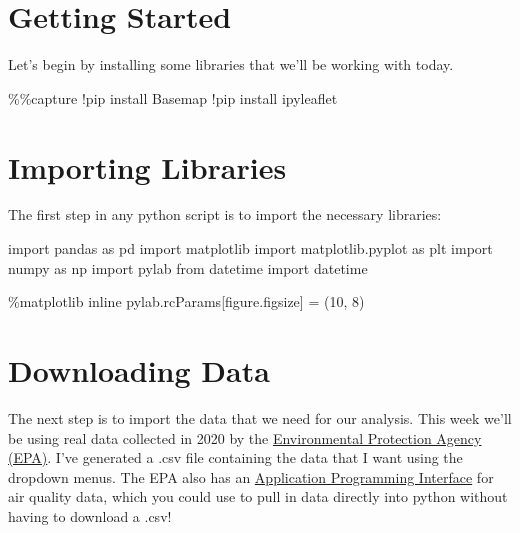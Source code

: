 \documentclass[
  letterpaper,
  DIV=11,
  numbers=noendperiod]{scrreprt}
\newenvironment{Shaded}{\begin{snugshade}}{\end{snugshade}}
\newcommand{\DecValTok}[1]{\textcolor[rgb]{0.68,0.00,0.00}{#1}}
\newcommand{\ImportTok}[1]{\textcolor[rgb]{0.00,0.46,0.62}{#1}}
\newcommand{\NormalTok}[1]{\textcolor[rgb]{0.00,0.23,0.31}{#1}}
\newcommand{\OperatorTok}[1]{\textcolor[rgb]{0.37,0.37,0.37}{#1}}
\newcommand{\StringTok}[1]{\textcolor[rgb]{0.13,0.47,0.30}{#1}}
\begin{document}
\hypertarget{getting-started}{%
\section{Getting Started}\label{getting-started}}

Let's begin by installing some libraries that we'll be working with
today.

\begin{Shaded}
\begin{Highlighting}[]
\OperatorTok{\%\%}\NormalTok{capture}
\OperatorTok{!}\NormalTok{pip install Basemap}
\OperatorTok{!}\NormalTok{pip install ipyleaflet}
\end{Highlighting}
\end{Shaded}

\hypertarget{importing-libraries}{%
\section{Importing Libraries}\label{importing-libraries}}

The first step in any python script is to import the necessary
libraries:

\begin{Shaded}
\begin{Highlighting}[]
\ImportTok{import}\NormalTok{ pandas }\ImportTok{as}\NormalTok{ pd}
\ImportTok{import}\NormalTok{ matplotlib}
\ImportTok{import}\NormalTok{ matplotlib.pyplot }\ImportTok{as}\NormalTok{ plt}
\ImportTok{import}\NormalTok{ numpy }\ImportTok{as}\NormalTok{ np}
\ImportTok{import}\NormalTok{ pylab}
\ImportTok{from}\NormalTok{ datetime }\ImportTok{import}\NormalTok{ datetime}

\OperatorTok{\%}\NormalTok{matplotlib inline}
\NormalTok{pylab.rcParams[}\StringTok{\textquotesingle{}figure.figsize\textquotesingle{}}\NormalTok{] }\OperatorTok{=}\NormalTok{ (}\DecValTok{10}\NormalTok{, }\DecValTok{8}\NormalTok{)}
\end{Highlighting}
\end{Shaded}

\hypertarget{downloading-data-1}{%
\section{Downloading Data}\label{downloading-data-1}}

The next step is to import the data that we need for our analysis. This
week we'll be using real data collected in 2020 by the
\href{https://www.epa.gov/outdoor-air-quality-data/download-daily-data}{Environmental
Protection Agency (EPA)}. I've generated a .csv file containing the data
that I want using the dropdown menus. The EPA also has an
\href{https://aqs.epa.gov/aqsweb/documents/data_api.html}{Application
Programming Interface} for air quality data, which you could use to pull
in data directly into python without having to download a .csv!
\end{document}
